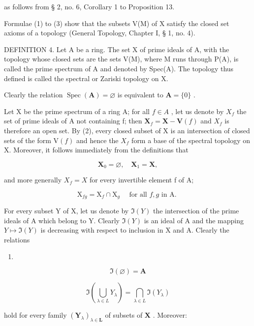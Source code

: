 as follows from § 2, no. 6, Corollary 1 to Proposition 13.

Formulae (1) to (3) show that the subsets V(M) of X satisfy the closed set axioms of a topology (General Topology, Chapter I, § 1, no. 4).

DEFINITION 4. Let A be a ring. The set X of prime ideals of A, with the topology whose closed sets are the sets V(M), where M runs through P(A), is called the prime spectrum of A and denoted by Spec(A). The topology thus defined is called the spectral or Zariski topology on X.

Clearly the relation \(\operatorname{Spec}(\mathbf{A}) = \varnothing\) is equivalent to \(\mathbf{A} = \{0\}\) .

Let X be the prime spectrum of a ring A; for all \(f \in A\) , let us denote by \(X_{f}\) the set of prime ideals of A not containing f; then \(\mathbf{X}_{f} = \mathbf{X} - \mathbf{V}(f)\) and \(X_{f}\) is therefore an open set. By (2), every closed subset of X is an intersection of closed sets of the form \(\mathrm{V}(f)\) and hence the \(X_{f}\) form a base of the spectral topology on X. Moreover, it follows immediately from the definitions that

\[
\mathbf {X} _ {0} = \varnothing , \quad \mathbf {X} _ {1} = \mathbf {X},\tag{5}
\]

and more generally \(X_{f} = X\) for every invertible element f of A;

\[
\mathrm{X} _ {f g} = \mathrm{X} _ {f} \cap \mathrm{X} _ {g} \quad \text {   for   all   } f, g \text {   in   A.   }\tag{6}
\]

For every subset Y of X, let us denote by \(\Im(Y)\) the intersection of the prime ideals of A which belong to Y. Clearly \(\Im(Y)\) is an ideal of A and the mapping \(Y \mapsto \Im(Y)\) is decreasing with respect to inclusion in X and A. Clearly the relations

\begin{enumerate}
\def\labelenumi{(\arabic{enumi})}
\setcounter{enumi}{6}
\tightlist
\item
\end{enumerate}

\[
\Im (\varnothing) = \mathbf {A}\tag{7}
\]

\[
\Im \left(\bigcup_ {\lambda \in L} Y _ {\lambda}\right) = \bigcap_ {\lambda \in L} \Im (Y _ {\lambda})\tag{8}
\]

hold for every family \((\mathbf{Y}_{\lambda})_{\lambda \in \mathbf{L}}\) of subsets of \(\mathbf{X}\) . Moreover:


